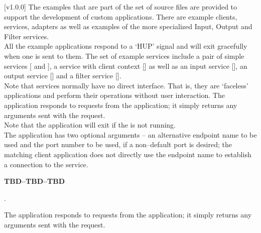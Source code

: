 [v1.0.0]
%
The examples that are part of the \mplusm{} set of source files are provided to support
the development of custom applications.
There are example clients, services, adapters as well as examples of the more specialized
Input, Output and Filter services.\\

All the example applications respond to a `HUP' signal and will exit gracefully when one
is sent to them.
The set of example services include a pair of simple services
[ and
], a service with client context
[] as well as an input service
[], an output service
[] and a filter service
[].\\

Note that services normally have no direct interface.
That is, they are `faceless' applications and perform their operations without user
interaction.
The  application responds to
 requests from the
 application; it simply returns any arguments
sent with the request.\\

Note that the application will exit if the
 is not running.\\

The application has two optional arguments -- an alternative endpoint name to be used and
the port number to be used, if a non--default port is desired; the matching client
application does not directly use the endpoint name to establish a connection to the
service.

			\begin{Large}\textbf{TBD--TBD--TBD}\end{Large}.

The  application responds to
 requests from the
 application; it simply returns any arguments
sent with the request.\\

